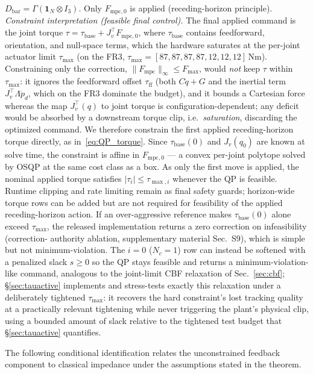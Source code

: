 \documentclass[journal]{IEEEtran}
\newcommand{\Fmpc}{F_{\text{mpc}}}
\newcommand{\Fmpck}[1]{F_{\text{mpc},#1}}
\begin{document}
$D_{\text{bar}}=\Gamma(\mathbf 1_N\otimes I_3)$.
Only $\Fmpck{0}$ is applied (receding-horizon principle).
\emph{Constraint interpretation (feasible final control).} The final
applied command is the joint torque
$\tau=\tau_{\text{base}}+J_v^\top\Fmpck{0}$, where
$\tau_{\text{base}}$ contains feedforward, orientation, and null-space terms,
which the hardware saturates at the per-joint actuator limit $\tau_{\max}$
(on the FR3, $\tau_{\max}=[87,87,87,87,12,12,12]$\,Nm). Constraining only the
correction, $\|\Fmpc\|_\infty\leq F_{\max}$, would \emph{not} keep $\tau$
within $\tau_{\max}$: it ignores the feedforward offset $\tau_{\text{ff}}$
(both $C\dot{q}+G$ and the inertial term $J_v^\top\Lambda\ddot{p}_d$, which on
the FR3 dominate the budget), and it bounds a Cartesian force whereas the map
$J_v^\top(q)$ to joint torque is configuration-dependent; any deficit would
be absorbed by a downstream torque clip, i.e.\ \emph{saturation}, discarding
the optimized command. We therefore constrain the first applied
receding-horizon torque directly, as in~\eqref{eq:QP_torque}. Since
$\tau_{\text{base}}(0)$ and $J_v(q_0)$ are known at solve time, the constraint
is affine in $\Fmpck{0}$ --- a convex per-joint polytope solved by OSQP at the
same cost class as a box. As only the first move is applied, the nominal
applied torque satisfies $|\tau_i|\leq\tau_{\max,i}$ whenever the QP is
feasible. Runtime clipping and rate limiting remain as final safety guards;
horizon-wide torque rows can be added but are not required for feasibility of
the applied receding-horizon action. If an over-aggressive reference makes
$\tau_{\text{base}}(0)$ alone exceed $\tau_{\max}$, the released
implementation returns a zero correction on infeasibility (correction-
authority ablation, supplementary material Sec.~S9), which is simple but
not minimum-violation. The $i=0$ ($N_c=1$) row can instead be softened with a
penalized slack $s\geq0$ so the QP stays feasible and returns a
minimum-violation-like command, analogous to the joint-limit CBF
relaxation of Sec.~\ref{sec:cbf}; \S\ref{sec:tauactive} implements and
stress-tests exactly this relaxation under a deliberately tightened
$\tau_{\max}$: it recovers the hard constraint's lost tracking quality at
a practically relevant tightening while never triggering the plant's
physical clip, using a bounded amount of slack relative to the tightened
test budget that \S\ref{sec:tauactive} quantifies.

The following conditional identification relates the unconstrained feedback
component to classical impedance under the assumptions stated in the theorem.
\end{document}
